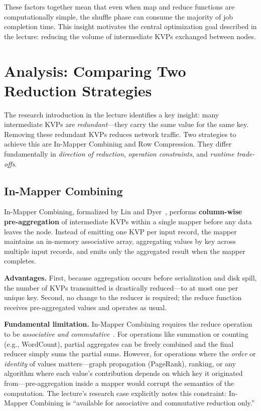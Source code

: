 \documentclass[a4paper,11pt]{article}
\begin{document}
These factors together mean that even when map and reduce functions are computationally simple, the shuffle phase can consume the majority of job completion time. This insight motivates the central optimization goal described in the lecture: reducing the volume of intermediate KVPs exchanged between nodes.

\section{Analysis: Comparing Two Reduction Strategies}

The research introduction in the lecture identifies a key insight: many intermediate KVPs are \textit{redundant}---they carry the same value for the same key. Removing these redundant KVPs reduces network traffic. Two strategies to achieve this are In-Mapper Combining and Row Compression. They differ fundamentally in \textit{direction of reduction}, \textit{operation constraints}, and \textit{runtime trade-offs}.

\subsection{In-Mapper Combining}

In-Mapper Combining, formalized by Lin and Dyer~\cite{lin2010}, performs \textbf{column-wise pre-aggregation} of intermediate KVPs within a single mapper before any data leaves the node. Instead of emitting one KVP per input record, the mapper maintains an in-memory associative array, aggregating values by key across multiple input records, and emits only the aggregated result when the mapper completes.

\textbf{Advantages.} First, because aggregation occurs before serialization and disk spill, the number of KVPs transmitted is drastically reduced---to at most one per unique key. Second, no change to the reducer is required; the reduce function receives pre-aggregated values and operates as usual.

\textbf{Fundamental limitation.} In-Mapper Combining requires the reduce operation to be \textit{associative and commutative}~\cite{lin2010}. For operations like summation or counting (e.g., WordCount), partial aggregates can be freely combined and the final reducer simply sums the partial sums. However, for operations where the \textit{order} or \textit{identity} of values matters---graph propagation (PageRank), ranking, or any algorithm where each value's contribution depends on which key it originated from---pre-aggregation inside a mapper would corrupt the semantics of the computation. The lecture's research case explicitly notes this constraint: In-Mapper Combining is ``available for associative and commutative reduction only.''
\end{document}

